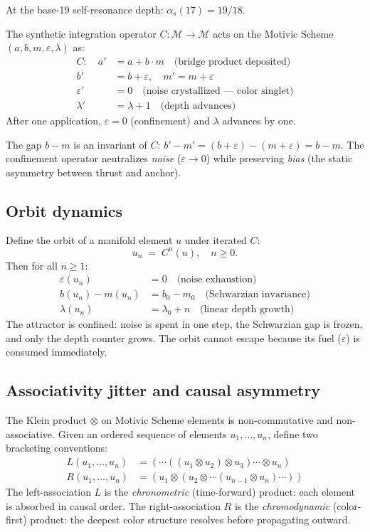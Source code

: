 At the base-19 self-resonance depth: $\alpha_s(17) = 19/18$.

The synthetic integration operator $C : \mathcal{M} \to \mathcal{M}$
acts on the Motivic Scheme $(a, b, m, \varepsilon, \lambda)$ as:
\begin{align}
C: \quad
a' &= a + b \cdot m \quad \text{(bridge product deposited)} \\
b' &= b + \varepsilon, \quad m' = m + \varepsilon \\
\varepsilon' &= 0 \quad \text{(noise crystallized --- color singlet)} \\
\lambda' &= \lambda + 1 \quad \text{(depth advances)}
\end{align}
After one application, $\varepsilon = 0$ (confinement) and
$\lambda$ advances by one.

\begin{proposition}
\label{prop:schwarzian}
The gap $b - m$ is an invariant of $C$:
$b' - m' = (b + \varepsilon) - (m + \varepsilon) = b - m$.
The confinement operator neutralizes \emph{noise}
($\varepsilon \to 0$) while preserving \emph{bias}
(the static asymmetry between thrust and anchor).
\end{proposition}

\subsection{Orbit dynamics}

Define the orbit of a manifold element $u$ under iterated $C$:
\[
u_n \;=\; C^n(u), \quad n \geq 0.
\]
Then for all $n \geq 1$:
\begin{align}
\varepsilon(u_n) &= 0 \quad \text{(noise exhaustion)} \\
b(u_n) - m(u_n) &= b_0 - m_0 \quad \text{(Schwarzian invariance)} \\
\lambda(u_n) &= \lambda_0 + n \quad \text{(linear depth growth)}
\end{align}
The attractor is confined: noise is spent in one step,
the Schwarzian gap is frozen, and only the depth counter
grows. The orbit cannot escape because its fuel ($\varepsilon$)
is consumed immediately.

\subsection{Associativity jitter and causal asymmetry}

The Klein product $\otimes$ on Motivic Scheme elements is
non-commutative and non-associative. Given an ordered sequence
of elements $u_1, \ldots, u_n$, define two bracketing conventions:
\begin{align}
L(u_1, \ldots, u_n) &= (\cdots((u_1 \otimes u_2) \otimes u_3) \cdots \otimes u_n) \\
R(u_1, \ldots, u_n) &= (u_1 \otimes (u_2 \otimes \cdots (u_{n-1} \otimes u_n) \cdots))
\end{align}
The left-association $L$ is the \emph{chronometric} (time-forward)
product: each element is absorbed in causal order. The
right-association $R$ is the \emph{chromodynamic} (color-first)
product: the deepest color structure resolves before propagating
outward.

